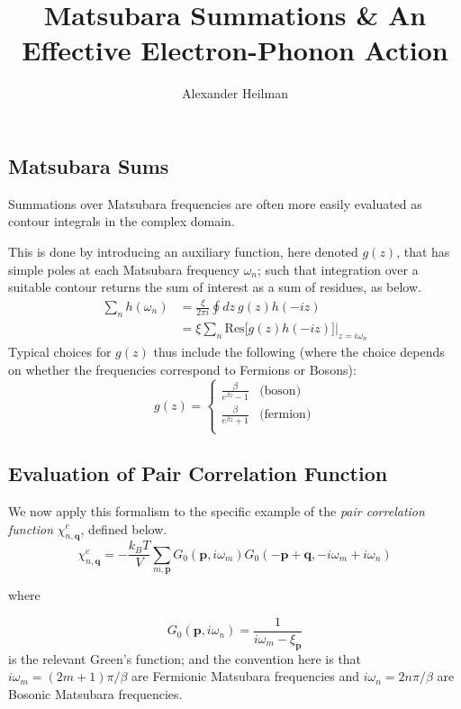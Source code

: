 \documentclass[10pt,a4paper]{article}
\title{Matsubara Summations \& An Effective Electron-Phonon Action }
\author{Alexander Heilman}
\begin{document}
\vspace{-3cm}
 
\maketitle

\begin{multicols}{2}

\section{Matsubara Sums}
Summations over Matsubara frequencies are often more easily evaluated as contour integrals in the complex domain. 

This is done by introducing an auxiliary function, here denoted $g(z)$, that has simple poles at each Matsubara frequency $\omega_n$; such that integration over a suitable contour returns the sum of interest as a sum of residues, as below.
\begin{align*}
\sum_{n}h(\omega_n)&=\frac{\xi}{2\pi i }\oint dz \ g(z)h(-iz)\\
& = \xi \sum_n \text{Res}\big[ g(z) h(-iz) \big]\big\vert_{z=i\omega_n}
\end{align*}
Typical choices for $g(z)$ thus include the following (where the choice depends on whether the frequencies correspond to Fermions or Bosons):
$$
g(z)=
    \begin{cases}
        \frac{\beta}{e^{\beta z}-1} & \text{(boson)}\\
        \frac{\beta}{e^{\beta z}+1} & \text{(fermion)}\\
    \end{cases}
$$

\subsection{Evaluation of Pair Correlation Function}
We now apply this formalism to the specific example of the \textit{pair correlation function} $\chi_{n,\mathbf{q}}^c$, defined below.\small
$$
\chi_{n,\mathbf{q}}^c = -\frac{k_BT}{V}\sum_{m,\mathbf{p}}G_{0}(\mathbf{p},i\omega_m)G_0(-\mathbf{p}+\mathbf{q},-i\omega_m+i\omega_n)
$$\normalsize
\begin{center}
where
\end{center}
$$
G_0(\mathbf{p},i\omega_n)=\frac{1}{i\omega_m-\xi_{\mathbf{p}}}
$$
is the relevant Green's function; and the convention here is that $i\omega_m=(2m+1)\pi/\beta$ are Fermionic Matsubara frequencies and $i\omega_n=2n\pi/\beta$ are Bosonic Matsubara frequencies.


\end{multicols}
\end{document}

